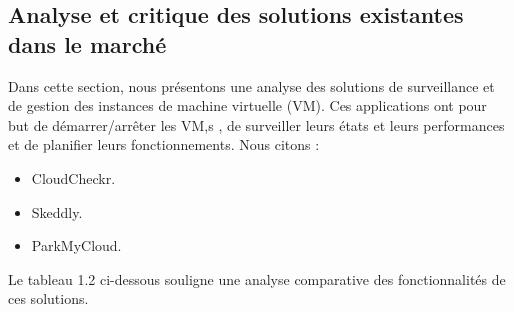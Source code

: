 \subsection{Analyse et critique des solutions existantes dans le marché}
Dans  cette  section,  nous  présentons  une  analyse  des  solutions  de  surveillance  et  de 
gestion  des  instances  de  machine  virtuelle  (VM).  Ces  applications  ont  pour  but  de 
démarrer/arrêter  les  VM,s  , de  surveiller  leurs  états  et  leurs  performances  et  de  planifier 
leurs  fonctionnements.
Nous citons : 
\begin{itemize}
	\item CloudCheckr.
	\item Skeddly.
	\item ParkMyCloud.
\end{itemize}
Le tableau 1.2 ci-dessous souligne une analyse comparative des fonctionnalités de ces solutions.
